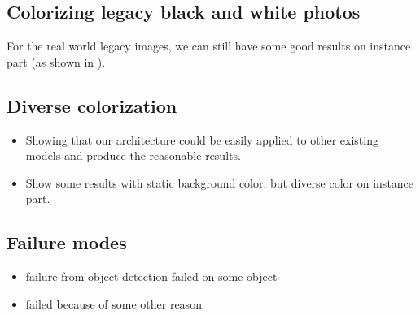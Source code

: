 {\subsection{Colorizing legacy black and white photos}
\label{sec:legacy}
For the real world legacy images, we can still have some good results on instance part (as shown in ).


\subsection{Diverse colorization}
\label{sec:diverseColorization}
\begin{itemize}
    \item Showing that our architecture could be easily applied to other existing models and produce the reasonable results.
    \item Show some results with static background color, but diverse color on instance part.
\end{itemize}


\subsection{Failure modes}
\label{sec:failure}
\begin{itemize}
    \item failure from object detection failed on some object
    \item failed because of some other reason
\end{itemize}
}



